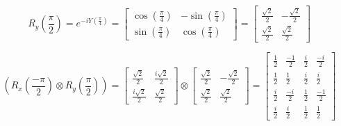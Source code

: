 \documentclass{article}
\begin{document}
\[
	R_y(\frac{\pi}{2}) = e^{ -i Y(\frac{\pi}{4})} =
	\begin{bmatrix}
		\cos(\frac{\pi}{4}) & -\sin(\frac{\pi}{4}) \\
		\sin(\frac{\pi}{4}) & \cos(\frac{\pi}{4})
	\end{bmatrix} =
	\begin{bmatrix}
		\frac{\sqrt{2}}{2} & -\frac{\sqrt{2}}{2} \\
		\frac{\sqrt{2}}{2} & \frac{\sqrt{2}}{2}
	\end{bmatrix}
\]

\[
	\left(R_x(\frac{-\pi}{2}) \otimes R_y(\frac{\pi}{2})\right) =
	\begin{bmatrix}
		\frac{\sqrt{2}}{2}   & \frac{i \sqrt{2}}{2} \\
		\frac{i \sqrt{2}}{2} & \frac{\sqrt{2}}{2}
	\end{bmatrix}
	\otimes
	\begin{bmatrix}
		\frac{\sqrt{2}}{2} & -\frac{\sqrt{2}}{2} \\
		\frac{\sqrt{2}}{2} & \frac{\sqrt{2}}{2}
	\end{bmatrix} =
	\begin{bmatrix}
		\frac{1}{2} & \frac{-1}{2} & \frac{i}{2} & \frac{-i}{2} \\
		\frac{1}{2} & \frac{1}{2}  & \frac{i}{2} & \frac{i}{2}  \\
		\frac{i}{2} & \frac{-i}{2} & \frac{1}{2} & \frac{-1}{2} \\
		\frac{i}{2} & \frac{i}{2}  & \frac{1}{2} & \frac{1}{2}
	\end{bmatrix}
\]
\end{document}
